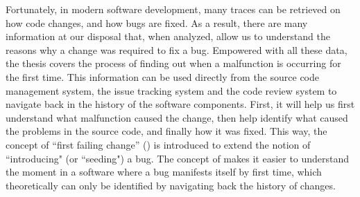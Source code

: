 \documentclass[a4paper, 12pt]{book}
\begin{document}


Fortunately, in modern software development, many traces can be retrieved on how code changes, and how bugs are fixed. As a result, there are many information at our disposal that, when analyzed, allow us to understand the reasons why a change was required to fix a bug. Empowered with all these data, the thesis covers the process of finding out when a malfunction is occurring for the first time. This information can be used directly from the source code management system, the issue tracking system and the code review system to navigate back in the history of the software components. First, it will help us first understand what malfunction caused the change, then help identify what caused the problems in the source code, and finally how it was fixed. This way, the concept of ``first failing change'' (\FFC) is introduced to extend the notion of ``introducing" (or ``seeding") a bug. The concept of \FFC makes it easier to understand the moment in a software where a bug manifests itself by first time, which theoretically can only be identified by navigating back the history of changes. 
\end{document}
